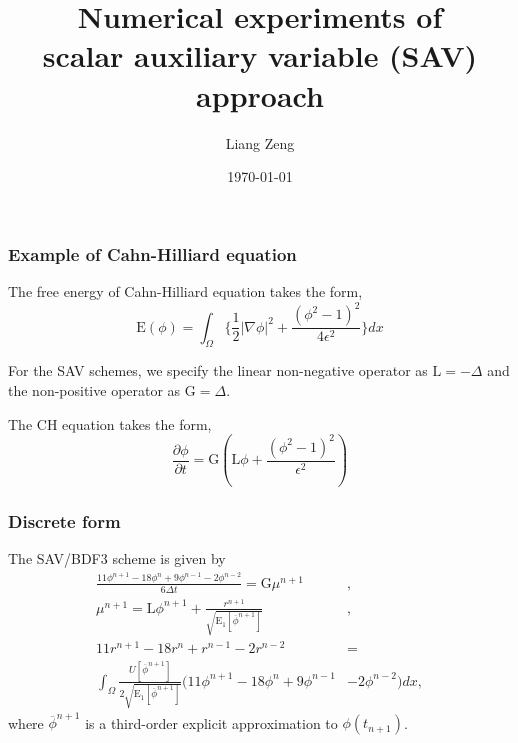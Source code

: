 \documentclass{beamer}
\begin{document}
\begin{frame}
	\title{Numerical experiments of \\
scalar auxiliary variable (SAV) approach}
	\author{Liang Zeng}
    \date{\today}
	
\titlepage
\end{frame}

\begin{frame}
\frametitle{Example of Cahn-Hilliard equation}
The free energy of Cahn-Hilliard equation takes the form,
$$
\mathrm{E}(\phi)=
\int_{\Omega}
\Big\{
\frac{1}{2}{\left|\nabla\phi\right|}^2
+\frac{({\phi}^2-1)^2}{4{\epsilon}^2}
\Big\}dx
$$

For the SAV schemes, we specify the linear non-negative operator as $\mathrm{L}=-\Delta$ and the non-positive operator as $\mathrm{G}=\Delta$.

The CH equation takes the form,
\begin{equation}\label{CN}
\frac{\partial\phi}{\partial t}
=\mathrm{G}(\mathrm{L}\phi
+\frac{({\phi}^2-1)^2}{{\epsilon}^2})
\end{equation}
\end{frame}

\begin{frame}
\frametitle{Discrete form}
The SAV/BDF3 scheme is given by
\begin{equation}\label{BDF3}
\begin{aligned}
   \frac{11{\phi}^{n+1}-18{\phi}^n + 9{\phi}^{n-1}-2{\phi}^{n-2}}{6\Delta t} = \mathrm{G}{\mu}^{n+1}&, \\
   {\mu}^{n+1}  = \mathrm{L}{\phi}^{n+1} 
   + \frac{r^{n+1}}{\sqrt{\mathrm{E}_1\left[{\overline{\phi}}^{n+1}\right]}}&, \\
    11r^{n+1}-18r^{n}+r^{n-1}-2r^{n-2} &= \\
    \int_{\Omega}
    \frac{U\left[{\overline{\phi}}^{n+1}\right]}{2\sqrt{\mathrm{E}_1\left[{\overline{\phi}}^{n+1}\right]}}
    (11{\phi}^{n+1}-18{\phi}^n+9{\phi}^{n-1}&-2{\phi}^{n-2})dx,
\end{aligned}
\end{equation}
where ${\overline{\phi}}^{n+1}$ is a third-order explicit approximation to $\phi(t_{n+1})$.
\end{frame}
\end{document}
